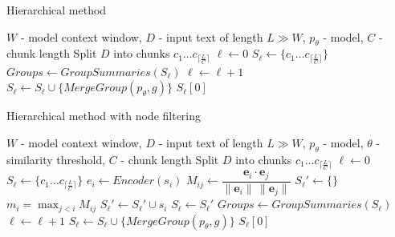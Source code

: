 \documentclass{superfri}
\begin{document}
\noindent
\begin{minipage}[t]{0.49\textwidth}
  \begin{algorithm}[H]
  \caption{Hierarchical method}\label{alg:h}
    \begin{algorithmic}
      \Require $W$ - model context window, $D$ - input text of length $L \gg W$, $p_\theta$ - model, $C$ - chunk length
      \State Split $D$ into chunks $c_1\dots c_{\lceil \frac{L}{C} \rceil}$
      \State $\ell \gets 0$
      \State $S_\ell \gets \{c_1\dots c_{\lceil \frac{L}{C} \rceil}\}$
      \Repeat
        \State $Groups \gets GroupSummaries(S_\ell)$
        \State $\ell \gets \ell + 1$
          \State $S_\ell \gets S_\ell \cup \{MergeGroup(p_\theta,g)\}$
        \EndFor
      \State \Return $S_\ell[0]$
    \end{algorithmic}
  \end{algorithm}
\end{minipage}\hfill
\begin{minipage}[t]{0.49\textwidth}
  \begin{algorithm}[H]
    \caption{Hierarchical method with node filtering}\label{alg:h_f}
    \begin{algorithmic}
      \Require $W$ - model context window, $D$ - input text of length $L \gg W$, $p_\theta$ - model, $\theta$ - similarity threshold, $C$ - chunk length
      \State Split $D$ into chunks $c_1\dots c_{\lceil \frac{L}{C} \rceil}$
      \State $\ell \gets 0$
      \State $S_\ell \gets \{c_1\dots c_{\lceil \frac{L}{C} \rceil}\}$
      \Repeat
          \State $e_i \gets Encoder(s_i)$
        \EndFor
        \State $M_{ij} \gets \dfrac{\mathbf{e}_i\cdot \mathbf{e}_j}{\|\mathbf{e}_i\|\,\|\mathbf{e}_j\|}$
        \State $S_\ell' \gets \{\}$
          \State $m_i=\max_{j<i} M_{ij}$
            \State $S_\ell' \gets S_\ell' \cup s_i$
          \EndIf
        \EndFor
        \State $S_\ell \gets S_\ell'$
        \State $Groups \gets GroupSummaries(S_\ell)$
        \State $\ell \gets \ell + 1$
          \State $S_\ell \gets S_\ell \cup \{MergeGroup(p_\theta,g)\}$
        \EndFor
      \State \Return $S_\ell[0]$
    \end{algorithmic}
  \end{algorithm}
\end{minipage}
\end{document}
